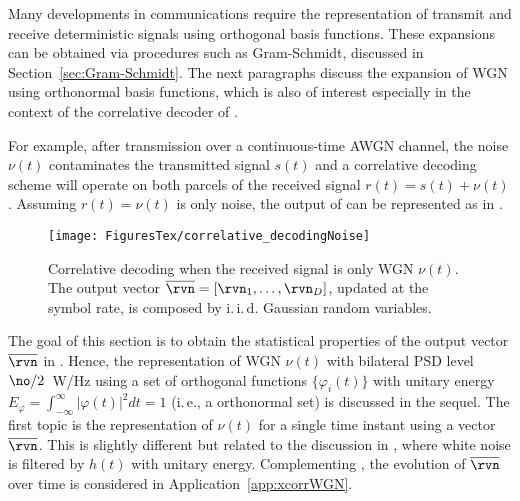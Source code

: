 Many developments in communications require the representation of transmit and receive deterministic signals using orthogonal basis functions. These expansions can be obtained via procedures such as Gram-Schmidt, discussed in Section~\ref{sec:Gram-Schmidt}.
The next paragraphs discuss the expansion of WGN using orthonormal basis functions, which is also of interest especially in the context of the correlative decoder of .

For example, after transmission over a continuous-time AWGN channel, the noise $\nu(t)$ contaminates the transmitted signal $s(t)$ and a correlative decoding scheme will operate on both parcels of the received signal $r(t) = s(t) + \nu(t)$. Assuming $r(t) = \nu(t)$ is only noise, the output of  can be represented as in .

\begin{figure}[htbp]
\centering
\texttt{[image: FiguresTex/correlative\_decodingNoise]}
\caption[Correlative decoding when the received signal is only WGN $\nu(t)$.]{Correlative decoding when the received signal is only WGN $\nu(t)$.  The output vector $\overline \rvn = [\rvn_1, \ldots, \rvn_D]$, updated at the symbol rate,  is composed by i.\,i.\,d. Gaussian random variables.\label{fig:correlative_decodingNoise}}
\end{figure}

The goal of this section is to obtain the statistical properties of the output vector $\overline \rvn$ in .
Hence, the representation of WGN $\nu(t)$ with bilateral PSD level $\no / 2$~W/Hz using a set of orthogonal functions $\{\varphi_i(t)\}$ with unitary energy $E_{\varphi} = \int_{-\infty}^{\infty}{|\varphi(t)|^2 } dt=1$ (i.\,e., a orthonormal set) is discussed in the sequel. The first topic is the representation of $\nu(t)$ for a single time instant using a vector  $\overline{\rvn}$. This is slightly different but related to the discussion in 
, where white noise is filtered by $h(t)$ with unitary energy. Complementing , the evolution of  $\overline{\rvn}$ over time is considered in Application~\ref{app:xcorrWGN}.


